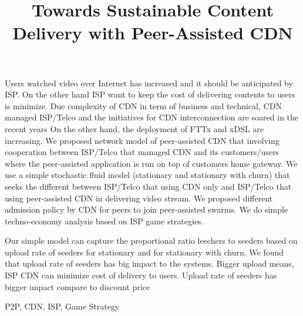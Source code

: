 \documentclass[paper]{ieice}
\title{Towards Sustainable Content Delivery with Peer-Assisted CDN}
\begin{document}
\maketitle

\begin{summary}
Users watched video over Internet has increased and it should be anticipated by ISP.  
On the other hand ISP want to keep the cost of delivering contents to users is minimize.
Due complexity of CDN in term of business and technical, CDN managed ISP/Telco and the initiatives for CDN interconnection are soared in the recent years
On the other hand, the deployment of FTTx and xDSL are increasing.  
We proposed network model of peer-assisted CDN that involving cooperation between ISP/Telco that managed CDN and its customers/users where the peer-assisted application is run on top of customers home gateway.  
We use a simple stochastic fluid model (stationary and stationary with churn) that seeks the different between ISP/Telco that using CDN only and ISP/Telco that using peer-assisted CDN in delivering video stream. We proposed different admission policy by CDN for peers to join peer-assisted swarms.  
We do simple techno-economy analysis based on ISP game strategies. 

Our simple model can capture the proportional ratio leechers to seeders based on upload rate of seeders for stationary and for stationary with churn.  
We found that upload rate of seeders has big impact to the systems. 
Bigger upload means, ISP CDN can minimize cost of delivery to users.   
Upload rate of seeders has bigger impact compare to discount price


\end{summary}
\begin{keywords}
P2P, CDN, ISP, Game Strategy
\end{keywords}  

\end{document}
